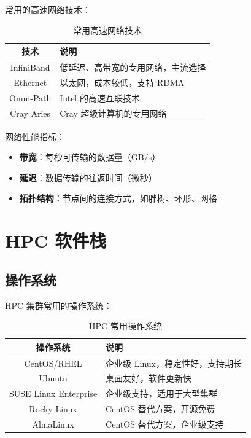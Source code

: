 \documentclass[12pt,UTF8]{ctexbook}
\begin{document}
常用的高速网络技术：
\begin{table}[htbp]
    \centering
    \caption{常用高速网络技术}
    \begin{tabular}{|c|p{8cm}|}
        \hline
        \textbf{技术} & \textbf{说明} \\
        \hline
        InfiniBand & 低延迟、高带宽的专用网络，主流选择 \\
        \hline
        Ethernet & 以太网，成本较低，支持 RDMA \\
        \hline
        Omni-Path & Intel 的高速互联技术 \\
        \hline
        Cray Aries & Cray 超级计算机的专用网络 \\
        \hline
    \end{tabular}
\end{table}

网络性能指标：
\begin{itemize}
    \item \textbf{带宽}：每秒可传输的数据量（GB/s）
    \item \textbf{延迟}：数据传输的往返时间（微秒）
    \item \textbf{拓扑结构}：节点间的连接方式，如胖树、环形、网格
\end{itemize}

\chapter{HPC 软件栈}
\label{chap:hpc_software_stack}

\section{操作系统}
\label{sec:operating_system}

HPC 集群常用的操作系统：

\begin{table}[htbp]
    \centering
    \caption{HPC 常用操作系统}
    \begin{tabular}{|c|p{8cm}|}
        \hline
        \textbf{操作系统} & \textbf{说明} \\
        \hline
        CentOS/RHEL & 企业级 Linux，稳定性好，支持期长 \\
        \hline
        Ubuntu & 桌面友好，软件更新快 \\
        \hline
        SUSE Linux Enterprise & 企业级支持，适用于大型集群 \\
        \hline
        Rocky Linux & CentOS 替代方案，开源免费 \\
        \hline
        AlmaLinux & CentOS 替代方案，企业级支持 \\
        \hline
    \end{tabular}
\end{table}
\end{document}
